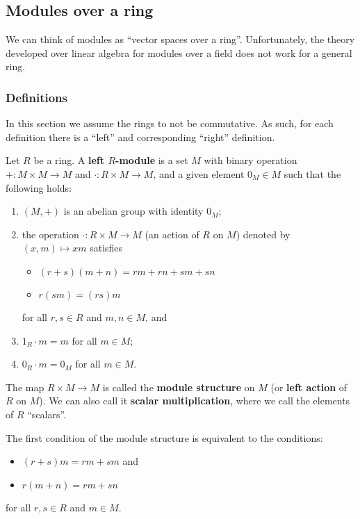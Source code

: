 \documentclass[12pt, a4paper]{article}
\begin{document}
\subsection{Modules over a ring}

\begin{mdnote}
    We can think of modules as ``vector spaces over a ring''. Unfortunately, the theory developed over linear algebra for modules over a field does not work for a general ring.
\end{mdnote}

\subsubsection{Definitions}

In this section we assume the rings to not be commutative. As such, for each definition there is a ``left'' and corresponding ``right'' definition.

\begin{definition}
    Let \(R\) be a ring. A \textbf{left \(R\)-module} is a set \(M\) with binary operation \(+ : M \times M \to M\) and \(\cdot : R\times M \to M\), and a given element \(0_M \in M\) such that the following holds:
    \begin{enumerate}
        \item \((M,+)\) is an abelian group with identity \(0_M\);
        \item the operation \(\cdot:R \times M \to M\) (an action of \(R\) on \(M\)) denoted by \((x,m) \mapsto xm\) satisfies
        \begin{itemize}
            \item \((r+s)(m+n)=rm+rn+sm+sn\)
            \item \(r(sm)=(rs)m\)
        \end{itemize}
        for all \(r,s \in R\) and \(m,n \in M\), and
        \item \(1_R \cdot m =m\) for all \(m \in M\);
        \item \(0_R \cdot m =0_M\) for all \(m \in M\).
    \end{enumerate}
    The map \(R \times M \to M\) is called the \textbf{module structure} on \(M\) (or \textbf{left action} of \(R\) on \(M\)). We can also call it \textbf{scalar multiplication}, where we call the elements of \(R\) ``scalars''.
\end{definition}

\begin{mdremark}
    The first condition of the module structure is equivalent to the conditions:
    \begin{itemize}
        \item \((r+s)m=rm+sm\) and 
        \item \(r(m+n)=rm+sn\)
    \end{itemize}
    for all \(r,s \in R\) and \(m \in M\).
\end{mdremark}
\end{document}
